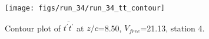 \begin{figure}[H]
\centering
\texttt{[image: figs/run\_34/run\_34\_tt\_contour]}
\caption{Contour plot of $\overline{t^\prime t^\prime}$ at $z/c$=8.50, $V_{free}$=21.13, station 4.}
\label{fig:run_34_tt_contour}
\end{figure}


